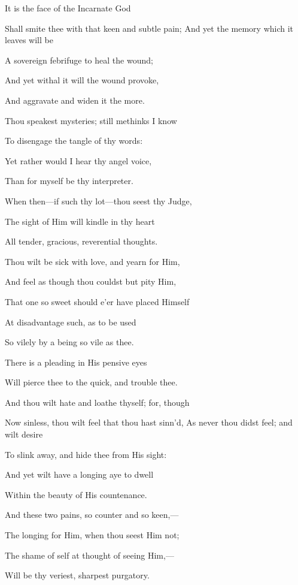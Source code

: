 It is the face of the Incarnate God

Shall smite thee with that keen and subtle pain; And yet the memory which it leaves will be

A sovereign febrifuge to heal the wound;

And yet withal it will the wound provoke,

And aggravate and widen it the more.


Thou speakest mysteries; still methinks I know

To disengage the tangle of thy words:

Yet rather would I hear thy angel voice,

Than for myself be thy interpreter.


When then—if such thy lot—thou seest thy Judge,

The sight of Him will kindle in thy heart

All tender, gracious, reverential thoughts.

Thou wilt be sick with love, and yearn for Him,

And feel as though thou couldst but pity Him,

That one so sweet should e'er have placed Himself

At disadvantage such, as to be used

So vilely by a being so vile as thee.

There is a pleading in His pensive eyes

Will pierce thee to the quick, and trouble thee.

And thou wilt hate and loathe thyself; for, though

Now sinless, thou wilt feel that thou hast sinn'd, As never thou didst feel; and wilt desire

To slink away, and hide thee from His sight:

And yet wilt have a longing aye to dwell

Within the beauty of His countenance.

And these two pains, so counter and so keen,—

The longing for Him, when thou seest Him not;

The shame of self at thought of seeing Him,—

Will be thy veriest, sharpest purgatory.


